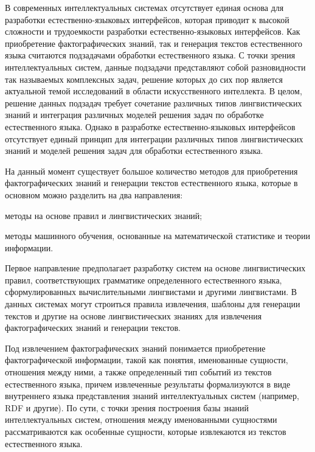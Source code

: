 В современных интеллектуальных системах отсутствует единая основа для разработки естественно-языковых интерфейсов, которая приводит к высокой сложности и трудоемкости разработки естественно-языковых интерфейсов. Как приобретение фактографических знаний, так и генерация текстов естественного языка считаются подзадачами обработки естественного языка. С точки зрения интеллектуальных систем, данные подзадачи представляют собой разновидности так называемых комплексных задач, решение которых до сих пор является актуальной темой исследований в области искусственного интеллекта. В целом, решение данных подзадач требует сочетание различных типов лингвистических знаний и интеграция различных моделей решения задач по обработке естественного языка. Однако в разработке естественно-языковых интерфейсов отсутствует единый принцип для интеграции различных типов лингвистических знаний и моделей решения задач для обработки естественного языка.

На данный момент существует большое количество методов для приобретения фактографических знаний и генерации текстов естественного языка, которые в основном можно разделить на два направления:
\begin{textitemize}
	\item методы на основе правил и лингвистических знаний;
	\item методы машинного обучения, основанные на математической статистике и теории информации.
\end{textitemize}

Первое направление предполагает разработку систем на основе лингвистических правил, соответствующих грамматике определенного естественного языка, сформулированных вычислительными лингвистами и другими лингвистами. В данных системах могут строиться правила извлечения, шаблоны для генерации текстов и другие на основе лингвистических знаниях для извлечения фактографических знаний и генерации текстов. 

Под извлечением фактографических знаний понимается приобретение фактографической информации, такой как понятия, именованные сущности, отношения между ними, а также определенный тип событий из текстов естественного языка, причем извлеченные результаты формализуются в виде внутреннего языка представления знаний интеллектуальных систем (например, RDF и другие). По сути, с точки зрения построения базы знаний интеллектуальных систем, отношения между именованными сущностями рассматриваются как особенные сущности, которые извлекаются из текстов естественного языка. 

